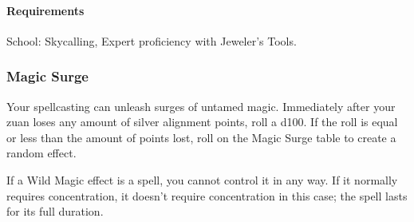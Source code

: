     \paragraph{Requirements} School: Skycalling, Expert proficiency with Jeweler's Tools.
\subsubsection{Magic Surge} \label{feat::magicsurge}
    Your spellcasting can unleash surges of untamed magic.
    Immediately after your zuan loses any amount of silver alignment points, roll a d100.
    If the roll is equal or less than the amount of points lost, roll on the Magic Surge table to create a random effect.

    If a Wild Magic effect is a spell, you cannot control it in any way.
    If it normally requires concentration, it doesn't require concentration in this case; the spell lasts for its full duration.

